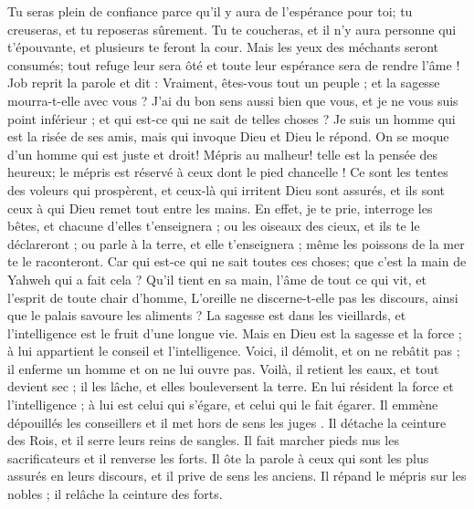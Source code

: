 \begin{multicols}{2}
 Tu seras plein de confiance 
parce qu'il y aura de l'espérance pour toi; tu creuseras, et tu reposeras sûrement.
Tu te coucheras, et il n'y aura personne qui t'épouvante, et plusieurs te feront la cour. 
Mais les yeux des méchants seront consumés; tout refuge leur sera ôté et toute leur espérance sera de rendre l'âme !
\VerseOne{}Job reprit la parole et dit :
Vraiment, êtes-vous tout un peuple ; et la sagesse mourra-t-elle avec vous ?
J'ai du bon sens aussi bien que vous, et je ne vous suis point inférieur ; et qui est-ce qui ne sait de telles choses ?
Je suis un homme qui est la risée de ses amis, mais qui invoque Dieu et Dieu le répond. On se moque d'un homme qui est juste et droit!
 Mépris au malheur! telle est la pensée des heureux; le mépris est réservé à ceux dont le pied chancelle !
Ce sont les tentes des voleurs qui prospèrent, et ceux-là qui irritent Dieu sont assurés, et ils sont ceux à qui Dieu remet tout entre les mains.
En effet, je te prie, interroge les bêtes, et chacune d'elles t'enseignera ; ou les oiseaux des cieux, et ils te le déclareront ;
ou parle à la terre, et elle t'enseignera ; même les poissons de la mer te le raconteront. 
Car qui est-ce qui ne sait toutes ces choses; que c'est la main de Yahweh qui a fait cela ?
 Qu'il tient en sa main, l'âme de tout ce qui vit, et l'esprit de toute chair d'homme,
L'oreille ne discerne-t-elle pas les discours, ainsi que le palais savoure les aliments ?
La sagesse est dans les vieillards, et l'intelligence est le fruit d'une longue vie.
Mais en Dieu est la sagesse et la force ; à lui appartient le conseil et l'intelligence.
Voici, il démolit, et on ne rebâtit pas ; il enferme un homme et on ne lui ouvre pas.
Voilà, il retient les eaux, et tout devient sec ; il les lâche, et elles bouleversent la terre.
 En lui résident la force et l'intelligence ; à lui est celui qui s'égare, et celui qui le fait égarer.
 Il emmène dépouillés les conseillers et il met hors de sens les juges .
Il détache la ceinture des Rois, et il serre leurs reins de sangles.
Il fait marcher pieds nus les sacrificateurs et il renverse les forts.
Il ôte la parole à ceux qui sont les plus assurés en leurs discours, et il prive de sens les anciens.
Il répand le mépris sur les nobles ; il relâche la ceinture des forts.

\end{multicols}
